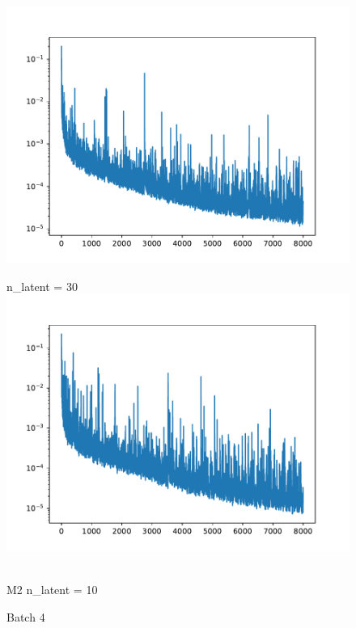 \documentclass[USenglish]{article}
\newcommand{\1}{\begin{pmatrix}
		1\\
		1
\end{pmatrix}}
\begin{document}
\begin{figure}
\begin{minipage}{0.32\textwidth}
\includegraphics[width=\textwidth, trim={20 0 45 30}, clip]{loss_convAE_trial_001_batch_180_n_dense_014.pdf}
\end{minipage}
\begin{minipage}{0.32\textwidth}
\centering
n\_latent = 30\\
\includegraphics[width=\textwidth, trim={20 0 45 30}, clip]{loss_convAE_trial_001_batch_180_n_dense_030.pdf}
\end{minipage}\\
M2 n\_latent = 10\\[0.5em]
\begin{minipage}{0.32\textwidth}
\centering
Batch 4\\

\end{minipage}
\end{figure}
\end{document}
